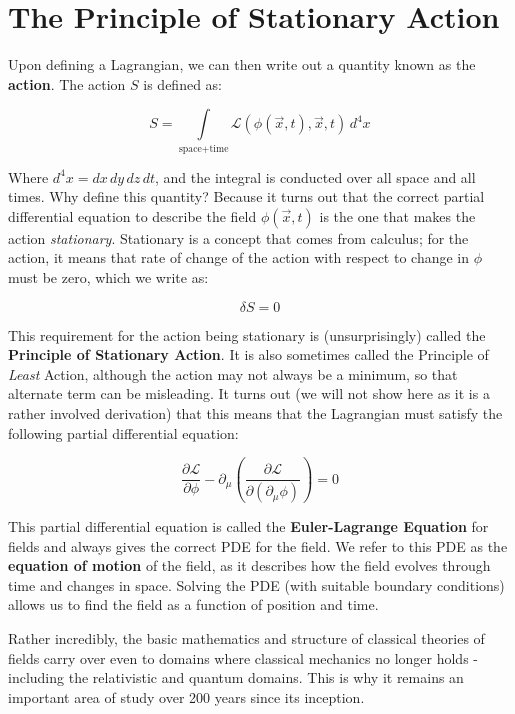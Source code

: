 \section{The Principle of Stationary Action}

Upon defining a Lagrangian, we can then write out a quantity known as the \textbf{action}. The action $S$ is defined as:

\begin{equation}
S = \int \limits_\text{space+time} \mathscr{L}(\phi(\vec x, t), \vec x, t)\, d^4 x
\end{equation}

Where $d^4 x = dx\, dy\, dz\, dt$, and the integral is conducted over all space and all times. Why define this quantity? Because it turns out that the correct partial differential equation to describe the field $\phi(\vec x, t)$ is the one that makes the action \emph{stationary}. Stationary is a concept that comes from calculus; for the action, it means that rate of change of the action with respect to change in $\phi$ must be zero, which we write as:

\begin{equation}
\delta S = 0
\end{equation}

This requirement for the action being stationary is (unsurprisingly) called the \textbf{Principle of Stationary Action}. It is also sometimes called the Principle of \emph{Least} Action, although the action may not always be a minimum, so that alternate term can be misleading. It turns out (we will not show here as it is a rather involved derivation) that this means that the Lagrangian must satisfy the following partial differential equation:

\begin{equation}
\frac{\partial \mathscr{L}}{\partial \phi} - \partial_\mu \left(\frac{\partial \mathscr{L}}{\partial (\partial_\mu \phi)}\right) = 0
\end{equation}

This partial differential equation is called the \textbf{Euler-Lagrange Equation} for fields  and always gives the correct PDE for the field. We refer to this PDE as the \textbf{equation of motion} of the field, as it describes how the field evolves through time and changes in space. Solving the PDE (with suitable boundary conditions) allows us to find the field as a function of position and time.

Rather incredibly, the basic mathematics and structure of classical theories of fields carry over even to domains where classical mechanics no longer holds - including the relativistic and quantum domains. This is why it remains an important area of study over 200 years since its inception.